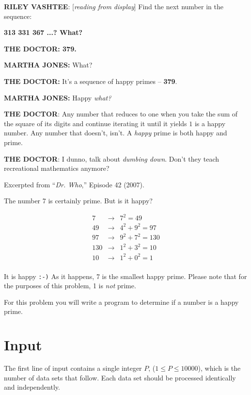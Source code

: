 
\noindent
\textbf{RILEY VASHTEE}: [\textit{reading from display}]  Find the next number in the sequence:

\begin{center}
    \textbf{313 331 367 ...? What?}
\end{center}

\noindent
\textbf{THE DOCTOR: 379.}

\noindent
\textbf{MARTHA JONES:} What?

\noindent
\textbf{THE DOCTOR:} It’s a sequence of happy primes – \textbf{379}.

\noindent
\textbf{MARTHA JONES:} Happy \textit{what?}

\noindent
\textbf{THE DOCTOR}: Any number that reduces to one when you take the sum of the
square of its digits and continue iterating it until it yields $1$ is a
happy number. Any number that doesn't, isn't.  A \emph{happy} prime is both
happy and prime.

\noindent
\textbf{THE DOCTOR}: I dunno, talk about \emph{dumbing down}.  
Don't they teach recreational mathematics anymore?

\noindent
Excerpted from ``\textit{Dr. Who},'' Episode 42 (2007).

The number 7 is certainly prime.  But is it happy?

\begin{eqnarray*}
    7 & \rightarrow & 7^2 = 49 \\
    49 & \rightarrow & 4^2 + 9^2 = 97 \\
    97 & \rightarrow & 9^2 + 7^2 = 130 \\
    130 & \rightarrow & 1^2 + 3^2 = 10 \\
    10 & \rightarrow & 1^2 + 0^2 = 1 \\
\end{eqnarray*}

\noindent
It is happy \texttt{:-)}
As it happens, 7 is the smallest happy prime.  
Please note that for the purposes of this problem, 1 is \emph{not} prime.

\noindent
For this problem you will write a program to determine if a number is a happy prime.

\section*{Input}

The first line of input contains a single integer $P$, ($1 \le P \le 10000$),
which is the number of data sets that follow.  Each data set should be
processed identically and independently.

